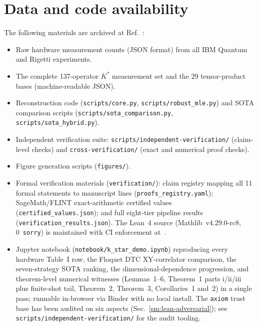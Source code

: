 \documentclass[twocolumn,prx,aps,superscriptaddress,longbibliography]{revtex4-2}
\begin{document}
\medskip
\begin{center}
\footnotesize

\end{center}

\section{Data and code availability}
\label{sm:data-code}

The following materials are archived at Ref.~\cite{zenodo}:
\begin{itemize}
\item Raw hardware measurement counts (JSON format) from all
IBM Quantum and Rigetti experiments.
\item The complete 137-operator $K^*$ measurement set and the
29 tensor-product bases (machine-readable JSON).
\item Reconstruction code (\texttt{scripts/core.py},
\texttt{scripts/robust\_mle.py}) and SOTA comparison scripts
(\texttt{scripts/sota\_comparison.py}, \texttt{scripts/sota\_hybrid.py}).
\item Independent verification suite:
\texttt{scripts/independent-verification/} (claim-level checks)
and \texttt{cross-verification/} (exact and numerical proof checks).
\item Figure generation scripts (\texttt{figures/}).
\item Formal verification materials (\texttt{verification/}):
  claim registry mapping all 11 formal statements to manuscript lines
  (\texttt{proofs\_registry.yaml});
  SageMath/FLINT exact-arithmetic certified values
  (\texttt{certified\_values.json});
  and full eight-tier pipeline results (\texttt{verification\_results.json}).
  The Lean~4 source (Mathlib~v4.29.0-rc8, 0~\texttt{sorry})
  is maintained with CI enforcement at~\cite{github_verification}.
\item Jupyter notebook (\texttt{notebook/k\_star\_demo.ipynb})
  reproducing every hardware Table~I row, the Floquet DTC
  XY-correlator comparison, the seven-strategy SOTA ranking, the
  dimensional-dependence progression, and theorem-level
  numerical witnesses (Lemmas~1--6, Theorem~1 parts i/ii/iii plus
  finite-shot tail, Theorem~2, Theorem~3, Corollaries~1 and~2) in
  a single pass; runnable in-browser via Binder with no local
  install.
  The \texttt{axiom} trust base has been audited on six aspects
  (Sec.~\ref{sm:lean-adversarial}); see
  \texttt{scripts/independent-verification/} for the
  audit tooling.
\end{itemize}


\end{document}
